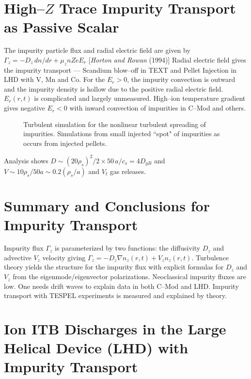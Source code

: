 \documentclass[a4paper,openany,12pt]{book}
\begin{document}
\section{High--$Z$ Trace Impurity Transport as Passive Scalar}

The impurity particle flux and radial electric field are given by
$\Gamma_z=-D_z\, dn/dr+\mu_z nZeE_r$ [\emph{Horton and Rowan} (1994)]
Radial electric field gives the impurity transport --- Scandium blow--off in TEXT and Pellet Injection in LHD with V, Mn and Co.
For the $E_r > 0$, the impurity convection is outward and the impurity density is hollow due to the positive radial electric field. 
$E_r(r,t)$ is complicated and largely unmeasured. High--ion temperature gradient gives negative $E_r < 0$ with inward convection of impurities in C--Mod and others.
%
\begin{figure}[H]
\centerline{}
\centerline{}
\caption{Turbulent simulation for the nonlinear turbulent spreading of impurities. Simulations from small injected ``spot" of impurities as occurs from injected pellets.}
\label{F9.31}
\end{figure}
%

Analysis shows $D\sim(20\rho_s)^2/2\times 50\,a/c_s=4D_{gB}$ and $V\sim 10\rho_s/50a\sim0.2(\rho_s/a)$ and $V_t$ gas releases.

\section{Summary and Conclusions for Impurity Transport}

Impurity flux $\Gamma_z$ is parameterized by two functions: the diffusivity $D_z$ and advective $V_z$ velocity giving $\Gamma_z=-D_z\nabla n_z(r,t)+V_z n_z(r,t)$. Turbulence theory yields the structure for the impurity flux with explicit formulas for $D_z$ and $V_z$ from the eigenmode/eigenvector polarizations. Neoclassical impurity fluxes are low. One needs drift waves to explain data in both C--Mod and LHD. Impurity transport with TESPEL experiments is measured and explained by theory.

\section{Ion ITB Discharges in the Large Helical Device (LHD) with Impurity Transport}
\end{document}
